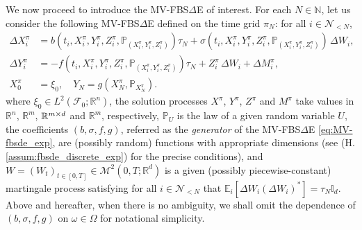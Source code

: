 \documentclass[11pt]{article}
\numberwithin{equation}{section}
\theoremstyle{definition}
\theoremstyle{remark}
\def\Om{\Omega}  \def\om{\omega} %
\newcommand{\q}{\quad}   \newcommand{\qq}{\qquad}
\def\l{\label}  \def\f{\frac}  \def\fa{\forall}
\def\cF{\mathcal{F}}
\def\cM{\mathcal{M}}
\def\cN{\mathcal{N}}
\def\sE{{\mathbb{E}}}
\def\sI{{\mathbb{I}}}
\def\sN{{\mathbb{N}}}
\def\sP{\mathbb{P}}
\def\sR{{\mathbb R}}
\newcommand{\fbsde}{FBS$\Delta$E }
\begin{document}
We now  proceed to introduce the MV-\fbsde of interest. 
For each $N\in\sN$, let us consider the following MV-\fbsde
defined on the time grid $\pi_N$: 
for all $i\in \cN_{<N}$,
\begin{subequations}\label{eq:MV-fbsde_exp}
\begin{align}
\Delta X^\pi_i&=b(t_{i},X^\pi_{i},Y^\pi_{i},Z^\pi_{i},\sP_{(X^\pi_{i},Y^\pi_{i},Z^\pi_{i})})\tau_N  
+\sigma (t_i,X^\pi_i,Y^\pi_i,Z^\pi_i,\sP_{(X^\pi_i,Y^\pi_i,Z^\pi_i)})\, \Delta W_i, 
\l{eq:fbsde_fwd_exp}\\
\Delta Y^\pi_i&=-f(t_{i},X^\pi_{i},Y^\pi_{i},Z^\pi_{i}, \sP_{(X^\pi_{i},Y^\pi_{i},Z^\pi_{i})})\tau_N+Z^\pi_i\,\Delta W_i+\Delta M^\pi_i,
\l{eq:fbsde_bwd_exp}\\
X^\pi_0&=\xi_0,\q Y_N=g(X^\pi_N,\sP_{X^\pi_N}).
\l{eq:fbsde_terminal_exp}
\end{align}
\end{subequations}
 where
 $\xi_0\in L^2(\cF_0;\sR^n)$,
 the solution processes 
 $X^\pi$, $Y^\pi$, $Z^\pi$ and $M^\pi$ take  values  in $\sR^n$, $\sR^m$, $\sR^{m\t d}$ and $\sR^m$, respectively,  
 $\sP_{U}$ is  the law of a given random variable $U$, 
 the coefficients $(b, \sigma, f, g)$, referred as the \textit{generator} of the MV-\fbsde \eqref{eq:MV-fbsde_exp}, are (possibly random) functions with appropriate dimensions (see (H.\ref{assum:fbsde_discrete_exp}) for the precise conditions),
 and 
  $W=(W_t)_{t\in [0,T]}\in \cM^2(0, T; \sR^{d})$ is a given 
  (possibly piecewise-constant)
 martingale
process
satisfying for all 
$i\in \cN_{<N}$ that
$\sE_i[\Delta W_i (\Delta W_i)^*]=\tau_N\sI_d$.
Above and hereafter, when there is no ambiguity, we shall omit the dependence of $(b, \sigma, f, g)$ on $\om\in \Om$ for notational simplicity.
\end{document}

